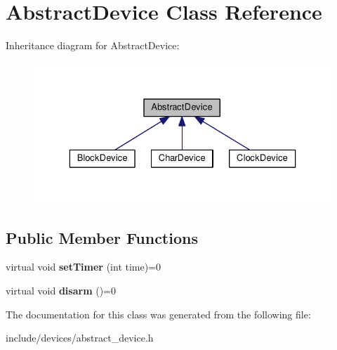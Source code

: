 \hypertarget{classAbstractDevice}{\section{\-Abstract\-Device \-Class \-Reference}
\label{db/d0e/classAbstractDevice}
}


\-Inheritance diagram for \-Abstract\-Device\-:\nopagebreak
\begin{figure}[H]
\begin{center}
\leavevmode
\includegraphics[width=329pt]{dd/d4d/classAbstractDevice__inherit__graph}
\end{center}
\end{figure}
\subsection*{\-Public \-Member \-Functions}
\begin{DoxyCompactItemize}
\item 
\hypertarget{classAbstractDevice_a393c627235e10b16507161febe32cae0}{virtual void {\bfseries set\-Timer} (int time)=0}\label{db/d0e/classAbstractDevice_a393c627235e10b16507161febe32cae0}

\item 
\hypertarget{classAbstractDevice_a4dcc0ef16c540b36a5b628db8f7fe315}{virtual void {\bfseries disarm} ()=0}\label{db/d0e/classAbstractDevice_a4dcc0ef16c540b36a5b628db8f7fe315}

\end{DoxyCompactItemize}


\-The documentation for this class was generated from the following file\-:\begin{DoxyCompactItemize}
\item 
include/devices/abstract\-\_\-device.\-h\end{DoxyCompactItemize}
